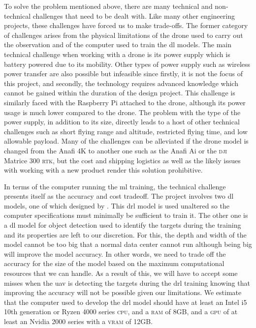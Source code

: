 \documentclass[../main.tex]{subfiles}
\begin{document}
To solve the problem mentioned above, 
there are many technical and non-technical challenges
that need to be dealt with.
Like many other engineering projects,
these challenges have forced us to make trade-offs.
The former category of challenges arises 
from the physical limitations of the drone used to
carry out the observation
and of the computer used to train the \gls{dl} models.
The main technical challenge when working with a drone
is its power supply which is battery powered due to its mobility. 
Other types of power supply such as wireless power transfer
are also possible but infeasible since firstly, it is not the
focus of this project, and secondly, the technology requires 
advanced knowledge which cannot be gained within the duration 
of the design project.
This challenge is similarly faced with the Raspberry Pi attached
to the drone, although its power usage 
is much lower compared to the drone.
The problem with the type of the power supply, in addition to its size, 
directly leads to a host of other technical challenges
such as short flying range and altitude, restricted flying time,
and low allowable payload.
Many of the challenges can be alleviated if the drone model is changed
from the Anafi 4K to another one such as 
the Anafi Ai or the \textsc{dji} Matrice 300 \textsc{rtk},
but the cost and shipping logistics as well as
the likely issues with working with a new product
render this solution prohibitive.

In terms of the computer running the \gls{ml} training,
the technical challenge presents itself as 
the accuracy and cost tradeoff.
The project involves two \gls{dl} models,
one of which designed by \textcite{Ged21}.
This \gls{drl} model is used unaltered so 
the computer specifications must minimally be sufficient 
to train it.
The other one is a \gls{dl} model for object detection
used to identify the targets during the training
and its properties are left to our discretion.
For this, 
the depth and width of the model cannot be too big that
a normal data center cannot run although 
being big will improve
the model accuracy. In other words, we need to trade off
the accuracy for the size of the model 
based on the maximum computational resources that we can handle. 
As a result of this, we will have to accept some misses
when the \gls{uav} is detecting the targets during the 
\gls{drl} training knowing that improving the accuracy 
will not be possible given our limitations.
We estimate that the computer used to develop the \gls{drl} model
should have at least an Intel i5 10th generation or
Ryzen 4000 series \textsc{cpu}, and a \textsc{ram} of 8GB, 
and a \textsc{gpu} of at least an Nvidia 2000 series
with a \textsc{vram} of 12GB.
\end{document}

